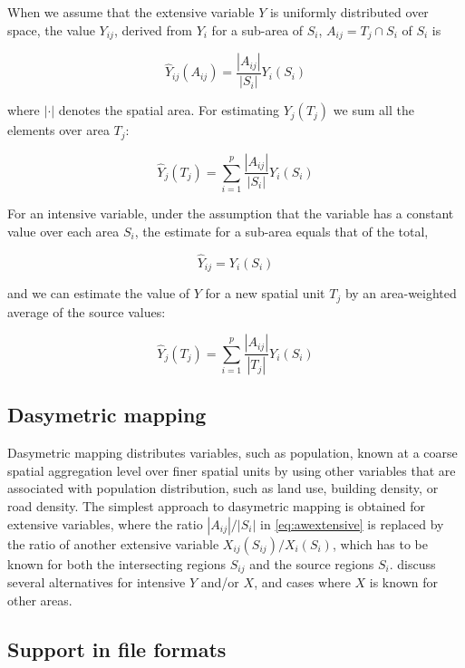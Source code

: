 \documentclass[]{book}
\begin{document}
When we assume that the extensive variable \(Y\) is uniformly
distributed over space, the value \(Y_{ij}\), derived from \(Y_i\)
for a sub-area of \(S_i\), \(A_{ij} = T_j \cap S_i\) of \(S_i\) is

\[\hat{Y}_{ij}(A_{ij}) = \frac{|A_{ij}|}{|S_i|} Y_i(S_i)\]

where \(|\cdot|\) denotes the spatial area.
For estimating \(Y_j(T_j)\) we sum all the elements over area \(T_j\):

\begin{equation}
\hat{Y}_j(T_j) = \sum_{i=1}^p \frac{|A_{ij}|}{|S_i|} Y_i(S_i)
\label{eq:awextensive}
\end{equation}

For an intensive variable, under the assumption that the variable
has a constant value over each area \(S_i\), the estimate for a
sub-area equals that of the total,

\[\hat{Y}_{ij} = Y_i(S_i)\]

and we can estimate the value of \(Y\) for a new spatial unit \(T_j\)
by an area-weighted average of the source values:

\begin{equation}
\hat{Y}_j(T_j) = \sum_{i=1}^p \frac{|A_{ij}|}{|T_j|} Y_i(S_i)
\label{eq:awintensive}
\end{equation}

\hypertarget{dasymetric-mapping}{%
\subsection{Dasymetric mapping}\label{dasymetric-mapping}}

Dasymetric mapping distributes variables, such as population,
known at a coarse spatial aggregation level over finer spatial
units by using other variables that are associated with population
distribution, such as land use, building density, or road density.
The simplest approach to dasymetric mapping is obtained for
extensive variables, where the ratio \(|A_{ij}| / |S_i|\) in
\eqref{eq:awextensive} is replaced by the ratio of another extensive
variable \(X_{ij}(S_{ij})/X_i(S_i)\), which has to be known for both
the intersecting regions \(S_{ij}\) and the source regions \(S_i\).
\citet{do} discuss several alternatives for intensive \(Y\) and/or \(X\),
and cases where \(X\) is known for other areas.

\hypertarget{support-in-file-formats}{%
\subsection{Support in file formats}\label{support-in-file-formats}}
\end{document}
